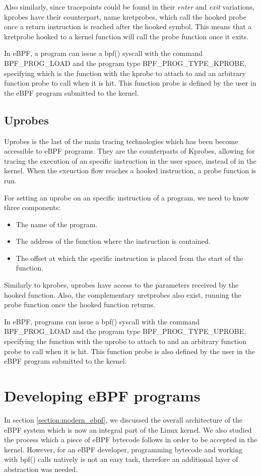 \documentclass[12pt]{report} %
\begin{document}
Also similarly, since tracepoints could be found in their \textit{enter} and \textit{exit} variations, kprobes have their counterpart, name kretprobes, which call the hooked probe once a return instruction is reached after the hooked symbol. This means that a kretprobe hooked to a kernel function will call the probe function once it exits.

In eBPF, a program can issue a bpf() syscall with the command BPF\_PROG\_LOAD and the program type BPF\_PROG\_TYPE\_KPROBE, specifying which is the function with the kprobe to attach to and an arbitrary function probe to call when it is hit. This function probe is defined by the user in the eBPF program submitted to the kernel.

\subsection{Uprobes}
Uprobes is the last of the main tracing technologies which has been become accessible to eBPF programs. They are the counterparts of Kprobes, allowing for tracing the execution of an specific instruction in the user space, instead of in the kernel. When the exeuction flow reaches a hooked instruction, a probe function is run. 

For setting an uprobe on an specific instruction of a program, we need to know three components:
\begin{itemize}
\item The name of the program.
\item The address of the function where the instruction is contained.
\item The offset at which the specific instruction is placed from the start of the function.
\end{itemize}

Similarly to kprobes, uprobes have access to the parameters received by the hooked function. Also, the complementary uretprobes also exist, running the probe function once the hooked function returns.

In eBPF, programs can issue a bpf() syscall with the command BPF\_PROG\_LOAD and the program type BPF\_PROG\_TYPE\_UPROBE, specifying the function with the uprobe to attach to and an arbitrary function probe to call when it is hit. This function probe is also defined by the user in the eBPF program submitted to the kernel.

\section{Developing eBPF programs}
In section \ref{section:modern_ebpf}, we discussed the overall architecture of the eBPF system which is now an integral part of the Linux kernel. We also studied the process which a piece of eBPF bytecode follows in order to be accepted in the kernel. However, for an eBPF developer, programming bytecode and working with bpf() calls natively is not an easy task, therefore an additional layer of abstraction was needed. 
\end{document}
